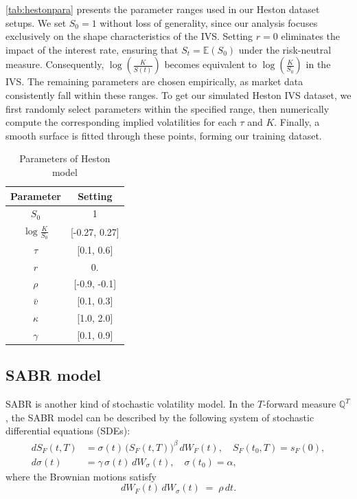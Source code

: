 \documentclass{article}
\begin{document}
{\autoref{tab:hestonpara} presents the parameter ranges used in our Heston dataset setups. We set $S_0 = 1$ without loss of generality, since our analysis focuses exclusively on the shape characteristics of the IVS. Setting $r = 0$ eliminates the impact of the interest rate, ensuring that $S_t = \mathbb{E}(S_0)$ under the risk-neutral measure. Consequently, $\log\left(\frac{K}{S(t)}\right)$ becomes equivalent to $\log\left(\frac{K}{S_0}\right)$ in the IVS. The remaining parameters are chosen empirically, as market data consistently fall within these ranges. To get our simulated Heston IVS dataset, we first randomly select parameters within the specified range, then numerically compute the corresponding implied volatilities for each $\tau$ and $K$. Finally, a smooth surface is fitted through these points, forming our training dataset.

\begin{table}[htpb]
    \centering
    \caption{Parameters of Heston model}
    \begin{tabular}{cc}
    \toprule
Parameter & Setting        \\
\midrule
$S_0$     & 1              \\
$\log \frac{K}{S_0}$  & [-0.27, 0.27]     \\
$\tau$       & [0.1, 0.6]     \\
$r$       & 0.      \\
$\rho$    & [-0.9, -0.1]   \\
$\bar{v}$ & [0.1, 0.3]     \\
$\kappa$  & [1.0, 2.0]     \\
$\gamma$  & [0.1, 0.9]     \\
\bottomrule
\end{tabular}
\label{tab:hestonpara}
\end{table}


\subsection{SABR model \cite{hagan2002managing}}
SABR is another kind of stochastic volatility model. In the $T$-forward measure $\mathbb{Q}^T$, the SABR model can be described by the following system of stochastic differential equations (SDEs):
\begin{align}
dS_F(t,T) &= \sigma(t)\,\bigl(S_F(t,T)\bigr)^{\beta}\,dW_F(t), 
\quad S_F(t_0,T) = s_F(0),\\
d\sigma(t) &= \gamma\,\sigma(t)\,dW_{\sigma}(t), 
\quad \sigma(t_0) = \alpha,
\end{align}
where the Brownian motions satisfy
\[
dW_F(t)\,dW_{\sigma}(t) \;=\; \rho\,dt.
\]

}
\end{document}
